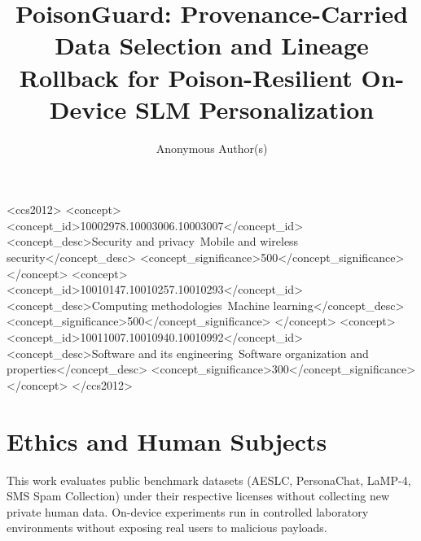 \documentclass[sigconf,10pt,anonymous]{acmart}
\theoremstyle{remark}
\begin{document}
\title[PoisonGuard: Provenance Selection and Lineage Rollback for On-Device SLMs]{PoisonGuard: Provenance-Carried Data Selection and Lineage Rollback for Poison-Resilient On-Device SLM Personalization}

\author{Anonymous Author(s)}

\begin{abstract}

\end{abstract}

\begin{CCSXML}
<ccs2012>
   <concept>
       <concept_id>10002978.10003006.10003007</concept_id>
       <concept_desc>Security and privacy~Mobile and wireless security</concept_desc>
       <concept_significance>500</concept_significance>
   </concept>
   <concept>
       <concept_id>10010147.10010257.10010293</concept_id>
       <concept_desc>Computing methodologies~Machine learning</concept_desc>
       <concept_significance>500</concept_significance>
   </concept>
   <concept>
       <concept_id>10011007.10010940.10010992</concept_id>
       <concept_desc>Software and its engineering~Software organization and properties</concept_desc>
       <concept_significance>300</concept_significance>
   </concept>
 </ccs2012>
\end{CCSXML}



\maketitle
\thispagestyle{plain}
\pagestyle{plain}













\section*{Ethics and Human Subjects}
This work evaluates public benchmark datasets (AESLC, PersonaChat, LaMP-4, SMS Spam Collection) under their respective licenses without collecting new private human data. On-device experiments run in controlled laboratory environments without exposing real users to malicious payloads.
\end{document}

